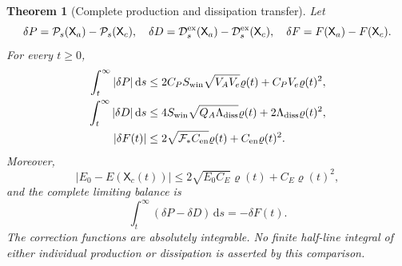 \documentclass[11pt]{article}
\numberwithin{equation}{section}
\newtheorem{theorem}{Theorem}[section]
\newcommand{\dd}{\,\mathrm d}
\begin{document}
\begin{theorem}[Complete production and dissipation transfer]
\label{r13:fulltransfer}
Let
\[
 \delta P=\mathcal P_s(\mathsf X_a)-\mathcal P_s(\mathsf X_c),\quad
 \delta D=\mathcal D^{\rm ex}_s(\mathsf X_a)
                         -\mathcal D^{\rm ex}_s(\mathsf X_c),\quad
 \delta F=F(\mathsf X_a)-F(\mathsf X_c).
\]
For every $t\ge0$,
\begin{align}
 \int_t^\infty|\delta P|\dd s
 &\le2C_PS_{\rm win}\sqrt{V_AV_e}\varrho(t)+C_PV_e\varrho(t)^2,
 \label{r13:productiontail}\\
 \int_t^\infty|\delta D|\dd s
 &\le4S_{\rm win}\sqrt{Q_A\Lambda_{\rm diss}}\varrho(t)
                         +2\Lambda_{\rm diss}\varrho(t)^2,
 \label{r13:dissipationtail}\\
 |\delta F(t)|
 &\le2\sqrt{\mathcal F_*C_{\rm en}}\varrho(t)
                          +C_{\rm en}\varrho(t)^2.
 \label{r13:energydifferencetail}
\end{align}
Moreover,
\begin{equation}\label{r13:fieldenergydifference}
 |E_0-E(\mathsf X_c(t))|
       \le2\sqrt{E_0C_E}\varrho(t)+C_E\varrho(t)^2,
\end{equation}
and the complete limiting balance is
\begin{equation}\label{r13:limitingbalance}
 \int_t^\infty(\delta P-\delta D)\dd s=-\delta F(t).
\end{equation}
The correction functions are absolutely integrable. No finite
half-line integral of either individual production or dissipation is
asserted by this comparison.
\end{theorem}
\end{document}
